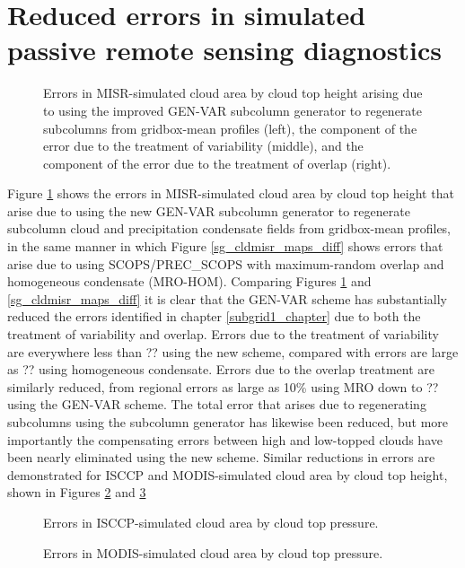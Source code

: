 \section{Reduced errors in simulated passive remote sensing diagnostics}
\label{subgrid2_passive_section}
\begin{figure}
\centering
\caption{Errors in MISR-simulated cloud area by cloud top height arising due to using the improved GEN-VAR subcolumn generator to regenerate subcolumns from gridbox-mean profiles (left), the component of the error due to the treatment of variability (middle), and the component of the error due to the treatment of overlap (right).}
\label{sgi_cldmisr_maps_diff}
\end{figure}
Figure \ref{sgi_cldmisr_maps_diff} shows the errors in MISR-simulated cloud area by cloud top height that arise due to using the new GEN-VAR subcolumn generator to regenerate subcolumn cloud and precipitation condensate fields from gridbox-mean profiles, in the same manner in which Figure \ref{sg_cldmisr_maps_diff} shows errors that arise due to using SCOPS/PREC\_SCOPS with maximum-random overlap and homogeneous condensate (MRO-HOM). Comparing Figures \ref{sgi_cldmisr_maps_diff} and \ref{sg_cldmisr_maps_diff} it is clear that the GEN-VAR scheme has substantially reduced the errors identified in chapter \ref{subgrid1_chapter} due to both the treatment of variability and overlap. Errors due to the treatment of variability are everywhere less than ?? using the new scheme, compared with errors are large as ?? using homogeneous condensate. Errors due to the overlap treatment are similarly reduced, from regional errors as large as 10\% using MRO down to ?? using the GEN-VAR scheme. The total error that arises due to regenerating subcolumns using the subcolumn generator has likewise been reduced, but more importantly the compensating errors between high and low-topped clouds have been nearly eliminated using the new scheme. Similar reductions in errors are demonstrated for ISCCP and MODIS-simulated cloud area by cloud top height, shown in Figures \ref{sgi_cldisccp_maps_diff} and \ref{sgi_cldmodis_maps_diff}

\begin{figure}
\centering
\caption{Errors in ISCCP-simulated cloud area by cloud top pressure.}
\label{sgi_cldisccp_maps_diff}
\end{figure}

\begin{figure}
\centering
\caption{Errors in MODIS-simulated cloud area by cloud top pressure.}
\label{sgi_cldmodis_maps_diff}
\end{figure}

